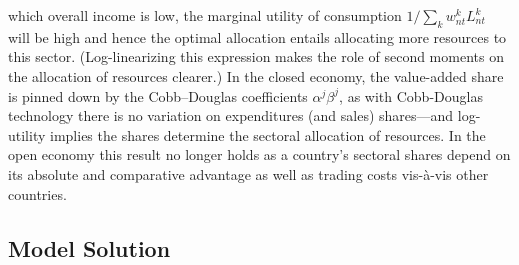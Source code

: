 \documentclass[12pt]{article}
\begin{document}
which overall income is low, the marginal utility of consumption $%
1/\sum_{k}w_{nt}^{k}L_{nt}^{k}$ will be high and hence the optimal
allocation entails allocating more resources to this sector.
(Log-linearizing this expression makes the role of second moments on the
allocation of resources clearer.) In the closed economy, the value-added
share is pinned down by the Cobb--Douglas coefficients $\alpha ^{j}\beta ^{j}
$, as with Cobb-Douglas technology there is no variation on expenditures
(and sales) shares---and log-utility implies the shares determine the
sectoral allocation of resources. In the open economy this result no longer
holds as a country's sectoral shares depend on its absolute and comparative
advantage as well as trading costs vis-\`{a}-vis other countries.

\subsection{Model Solution}
\end{document}
